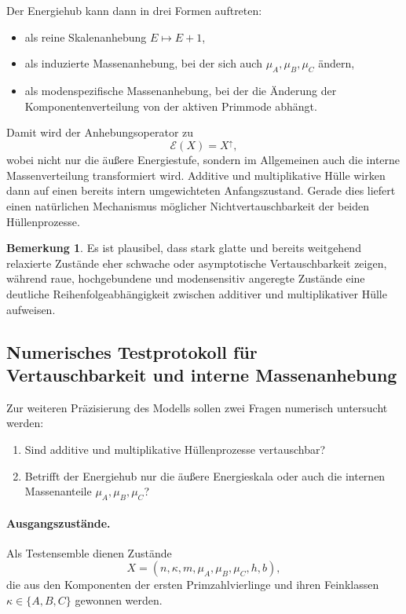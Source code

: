 \documentclass[11pt,a4paper]{article}
\theoremstyle{definition}
\newtheorem{bemerkung}{Bemerkung}
\begin{document}
Der Energiehub kann dann in drei Formen auftreten:
\begin{itemize}
	\item als reine Skalenanhebung \(E\mapsto E+1\),
	\item als induzierte Massenanhebung, bei der sich auch \(\mu_A,\mu_B,\mu_C\) ändern,
	\item als modenspezifische Massenanhebung, bei der die Änderung der Komponentenverteilung von der aktiven Primmode abhängt.
\end{itemize}

Damit wird der Anhebungsoperator zu
\[
\mathcal E(X)=X^\uparrow,
\]
wobei nicht nur die äußere Energiestufe, sondern im Allgemeinen auch die interne Massenverteilung transformiert wird. Additive und multiplikative Hülle wirken dann auf einen bereits intern umgewichteten Anfangszustand. Gerade dies liefert einen natürlichen Mechanismus möglicher Nichtvertauschbarkeit der beiden Hüllenprozesse.

\begin{bemerkung}
	Es ist plausibel, dass stark glatte und bereits weitgehend relaxierte Zustände eher schwache oder asymptotische Vertauschbarkeit zeigen, während raue, hochgebundene und modensensitiv angeregte Zustände eine deutliche Reihenfolgeabhängigkeit zwischen additiver und multiplikativer Hülle aufweisen.
\end{bemerkung}
\subsection{Numerisches Testprotokoll für Vertauschbarkeit und interne Massenanhebung}

Zur weiteren Präzisierung des Modells sollen zwei Fragen numerisch untersucht werden:
\begin{enumerate}
	\item Sind additive und multiplikative Hüllenprozesse vertauschbar?
	\item Betrifft der Energiehub nur die äußere Energieskala oder auch die internen Massenanteile \(\mu_A,\mu_B,\mu_C\)?
\end{enumerate}

\paragraph{Ausgangszustände.}
Als Testensemble dienen Zustände
\[
X=(n,\kappa,m,\mu_A,\mu_B,\mu_C,h,b),
\]
die aus den Komponenten der ersten Primzahlvierlinge und ihren Feinklassen \(\kappa\in\{A,B,C\}\) gewonnen werden.
\end{document}
